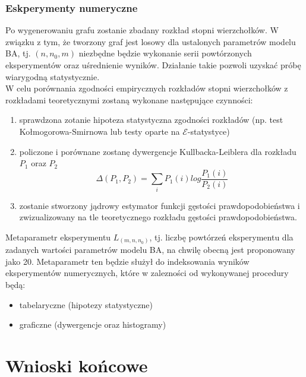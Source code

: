 \documentclass{article}
\def\lecturemark{}
\newcommand{\spr}[1]{\part{#1}\def\lecturemark{\partname\ \thepart: #1}}
\renewcommand{\partname}{Sprawozdanie}
\renewcommand{\thepart}{\arabic{part}}
\begin{document}
\section{Eskperymenty numeryczne \label{s6}} 
	Po wygenerowaniu grafu zostanie zbadany rozkład stopni wierzchołków. W związku z tym, że tworzony graf
	jest losowy dla ustalonych parametrów modelu BA, tj. $(n, n_0, m)$ niezbędne będzie wykonanie
	serii powtórzonych eksperymentów oraz uśrednienie wyników. Działanie takie pozwoli uzyskać próbę 
	wiarygodną statystycznie. \\
	W celu porównania zgodności empirycznych rozkładów stopni wierzchołków z rozkładami teoretycznymi
	zostaną wykonane następujące czynności:
		\begin{enumerate}
			\item sprawdzona zotanie hipoteza statystyczna zgodności rozkładów (np. test Kołmogorowa-Smirnowa lub testy oparte na $\mathcal{E}$-statystyce)
			\item policzone i porównane zostanę dywergencje Kullbacka-Leiblera dla rozkładu $P_1$ oraz $P_2$
				\begin{equation}
					\Delta(P_1, P_2) = \sum_{i} P_{1}(i)log\frac{P_{1}(i)}{P_{2}(i)}
				\end{equation}
			\item zostanie stworzony jądrowy estymator funkcji gęstości prawdopodobieństwa i zwizualizowany na tle teoretycznego rozkładu gęstości prawdopodobieństwa. 
		\end{enumerate}
		Metaparametr eksperymentu $L_{(m, n, n_0)}$, tj. liczbę powtórzeń eksperymentu dla zadanych wartości parametrów modelu BA, na chwilę obecną jest proponowany jako 20.  
		Metaparametr ten będzie służył do indeksowania wyników eksperymentów numerycznych, które 
		w zalezności od wykonywanej procedury będą:
		\begin{itemize}
			\item tabelaryczne (hipotezy statystyczne) 
			\item graficzne (dywergencje oraz histogramy)
		\end{itemize}
\spr{Wnioski końcowe \label{part3}}
{}

\end{document}
